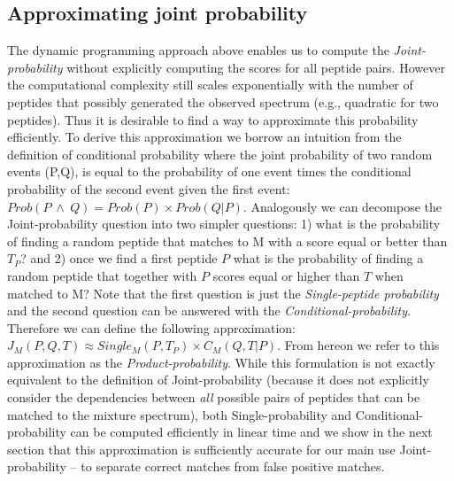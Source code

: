 \documentclass[runningheads,a4paper]{llncs}
\begin{document}
\subsection*{Approximating joint probability}
The dynamic programming approach above enables us to compute the \emph{Joint-probability} without explicitly computing the scores for all peptide pairs. However the computational complexity still scales exponentially with the number of peptides that possibly generated the observed spectrum (e.g., quadratic for two peptides).  Thus it is desirable to find a way to approximate this probability efficiently. To derive this approximation we borrow an intuition from the definition of conditional probability where the joint probability of two random events (P,Q), is equal to the probability of one event times the conditional probability of the second event given the first event: $Prob(P\ \wedge\ Q) = Prob(P)\times Prob(Q|P)$. Analogously we can decompose the Joint-probability question into two simpler questions: 1) what is the probability of finding a random peptide that matches to M with a score equal or better than $T_{P}$? and 2) once we find a first peptide $P$ what is the probability of finding a random peptide that together with $P$ scores equal or higher than $T$ when matched to M?  Note that the first question is just the \emph{Single-peptide probability} and the second question can be answered with the \emph{Conditional-probability}. Therefore we can define the following approximation:
$J_M(P,Q,T) \approx Single_M(P,T_{P}) \times C_M(Q,T| P)$. From hereon we refer to this approximation as the \emph{Product-probability}.
While this formulation is not exactly equivalent to the definition of Joint-probability (because it does not explicitly consider the dependencies between {\em all} possible pairs of peptides that can be matched to the mixture spectrum), both Single-probability and Conditional-probability can be computed efficiently in linear time and we show in the next section that this approximation is sufficiently accurate for our main use Joint-probability -- to separate correct matches from false positive matches.
\end{document}
